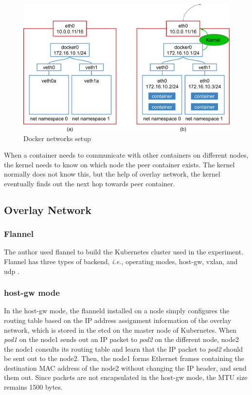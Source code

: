 \begin{figure}[h]
  \centering
  \includegraphics[width=0.8\columnwidth]{Figs/bridge+veth}

  \par\bigskip
  \centering
  \begin{minipage}{0.9\columnwidth}
    \caption[Docker networks setup]{
      Docker networks setup
    }
    \label{fig:bridge+veth}
  \end{minipage}
\end{figure}
 
When a container needs to communicate with other containers on different nodes, the kernel needs to know on which node the peer container exists.
The kernel normally does not know this, but  the help of overlay network, the kernel eventually finds out the next hop towards peer container.

\FloatBarrier

\subsection{Overlay Network}

\subsubsection{Flannel}

The author used flannel to build the Kubernetes cluster used in the experiment.
Flannel has three types of backend, {\it i.e.}, operating modes, host-gw, vxlan, and udp \cite{CoreOSFlannelBackend}.

\subsubsection{host-gw mode}

In the host-gw mode, the flanneld installed on a node simply configures the routing table  
based on the IP address assignment information of the overlay network, which is stored in the etcd on the master node of Kubernetes.
When {\em pod1} on the node1 sends out an IP packet to {\em pod2} on the different node, node2\added{,} 
the node1 consults its routing table and learn that the IP packet to {\em pod2} should be sent out to the node2.
Then, the node1 forms Ethernet frames containing the destination MAC address of the node2 
without changing the IP header, and send them out.
Since packets are not encapsulated in the host-gw mode, the MTU size remains 1500 bytes.

